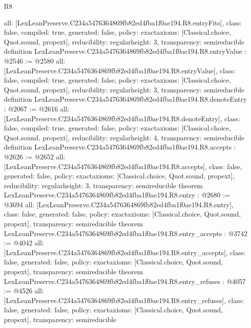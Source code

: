 \begin{lexlean}{R8}
\begin{coremodule}
{  all: [LexLeanPreserve.C234a5476364869fb82ed4fba1f0ae194.R8.entryFits],
  class: false,
  compiled: true,
  generated: false,
  policy: exact{axioms: [Classical.choice, Quot.sound, propext]},
  reducibility: regular{height: 3},
  transparency: semireducible
}
definition LexLeanPreserve.C234a5476364869fb82ed4fba1f0ae194.R8.entryValue : @2546 := @2580 {
  all: [LexLeanPreserve.C234a5476364869fb82ed4fba1f0ae194.R8.entryValue],
  class: false,
  compiled: true,
  generated: false,
  policy: exact{axioms: [Classical.choice, Quot.sound, propext]},
  reducibility: regular{height: 3},
  transparency: semireducible
}
definition LexLeanPreserve.C234a5476364869fb82ed4fba1f0ae194.R8.denoteEntry : @2067 := @2616 {
  all: [LexLeanPreserve.C234a5476364869fb82ed4fba1f0ae194.R8.denoteEntry],
  class: false,
  compiled: true,
  generated: false,
  policy: exact{axioms: [Classical.choice, Quot.sound, propext]},
  reducibility: regular{height: 4},
  transparency: semireducible
}
definition LexLeanPreserve.C234a5476364869fb82ed4fba1f0ae194.R8.accepts : @2626 := @2652 {
  all: [LexLeanPreserve.C234a5476364869fb82ed4fba1f0ae194.R8.accepts],
  class: false,
  generated: false,
  policy: exact{axioms: [Classical.choice, Quot.sound, propext]},
  reducibility: regular{height: 3},
  transparency: semireducible
}
theorem LexLeanPreserve.C234a5476364869fb82ed4fba1f0ae194.R8.entry : @2680 := @3694 {
  all: [LexLeanPreserve.C234a5476364869fb82ed4fba1f0ae194.R8.entry],
  class: false,
  generated: false,
  policy: exact{axioms: [Classical.choice, Quot.sound, propext]},
  transparency: semireducible
}
theorem LexLeanPreserve.C234a5476364869fb82ed4fba1f0ae194.R8.entry_accepts : @3742 := @4042 {
  all: [LexLeanPreserve.C234a5476364869fb82ed4fba1f0ae194.R8.entry_accepts],
  class: false,
  generated: false,
  policy: exact{axioms: [Classical.choice, Quot.sound, propext]},
  transparency: semireducible
}
theorem LexLeanPreserve.C234a5476364869fb82ed4fba1f0ae194.R8.entry_refuses : @4057 := @4526 {
  all: [LexLeanPreserve.C234a5476364869fb82ed4fba1f0ae194.R8.entry_refuses],
  class: false,
  generated: false,
  policy: exact{axioms: [Classical.choice, Quot.sound, propext]},
  transparency: semireducible
}


\end{coremodule}
\end{lexlean}
